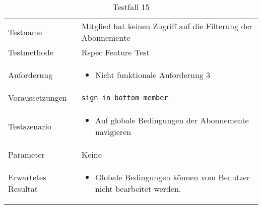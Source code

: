 \begin{table}[h!]
   \begin{tabular}{|L{0.4\textwidth}|L{0.6\textwidth}|}
       \hline
         \\[12pt]
       \hline
        Testname & Mitglied hat keinen Zugriff auf die Filterung der Abonnemente \\
       \hline
       Testmethode & Rspec Feature Test \\
       \hline
        Anforderung & 
        \begin{itemize}
         \item Nicht funktionale Anforderung 3
         \end{itemize}  \\
       \hline
       Voraussetzungen & \texttt{sign\_in bottom\_member} \\
       \hline
       Testszenario & 
       \begin{itemize}
         \item Auf globale Bedingungen der Abonnemente navigieren
       \end{itemize} \\
       \hline
       Parameter & Keine \\
       \hline
       Erwartetes Resultat & 
       \begin{itemize}
         \item Globale Bedingungen können vom Benutzer nicht bearbeitet werden.
       \end{itemize} \\
     \hline
     \end{tabular}
     \caption{Testfall 15}
\end{table}

\newpage


